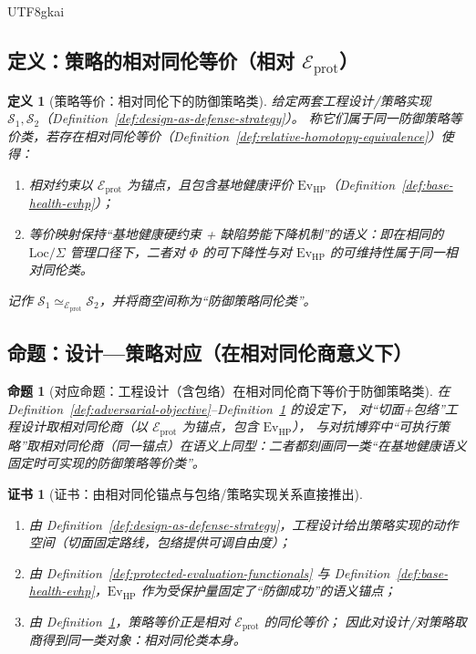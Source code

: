 \documentclass[12pt]{article}
\newtheorem{definition}{定义}[section]
\newtheorem{proposition}{命题}[section]
\newtheorem{certificate}{证书}[section]
\begin{document}
\begin{CJK*}{UTF8}{gkai}
\subsection{定义：策略的相对同伦等价（相对 $\mathcal{E}_{\mathrm{prot}}$）}

\begin{definition}[策略等价：相对同伦下的防御策略类]
\label{def:relative-strategy-equivalence}
给定两套工程设计/策略实现 $\mathcal{S}_1,\mathcal{S}_2$（Definition~\ref{def:design-as-defense-strategy}）。
称它们属于同一防御策略等价类，若存在相对同伦等价（Definition~\ref{def:relative-homotopy-equivalence}）使得：
\begin{enumerate}
  \item 相对约束以 $\mathcal{E}_{\mathrm{prot}}$ 为锚点，且包含基地健康评价 $\mathrm{Ev}_{\mathrm{HP}}$（Definition~\ref{def:base-health-evhp}）；
  \item 等价映射保持“基地健康硬约束 + 缺陷势能下降机制”的语义：即在相同的 $\mathrm{Loc}/\Sigma$ 管理口径下，二者对 $\Phi$ 的可下降性与对 $\mathrm{Ev}_{\mathrm{HP}}$
    的可维持性属于同一相对同伦类。
\end{enumerate}
记作 $\mathcal{S}_1\simeq_{\mathcal{E}_{\mathrm{prot}}}\mathcal{S}_2$，并将商空间称为“防御策略同伦类”。
\end{definition}

\subsection{命题：设计—策略对应（在相对同伦商意义下）}

\begin{proposition}[对应命题：工程设计（含包络）在相对同伦商下等价于防御策略类]
\label{prop:design-strategy-correspondence}
在 Definition~\ref{def:adversarial-objective}--Definition~\ref{def:relative-strategy-equivalence} 的设定下，
对“切面+包络”工程设计取相对同伦商（以 $\mathcal{E}_{\mathrm{prot}}$ 为锚点，包含 $\mathrm{Ev}_{\mathrm{HP}}$），
与对抗博弈中“可执行策略”取相对同伦商（同一锚点）在语义上同型：二者都刻画同一类“在基地健康语义固定时可实现的防御策略等价类”。
\end{proposition}

\begin{certificate}[证书：由相对同伦锚点与包络/策略实现关系直接推出]
\label{cert:design-strategy-correspondence}
\begin{enumerate}
  \item 由 Definition~\ref{def:design-as-defense-strategy}，工程设计给出策略实现的动作空间（切面固定路线，包络提供可调自由度）；
  \item 由 Definition~\ref{def:protected-evaluation-functionals} 与 Definition~\ref{def:base-health-evhp}，$\mathrm{Ev}
    _{\mathrm{HP}}$ 作为受保护量固定了“防御成功”的语义锚点；
  \item 由 Definition~\ref{def:relative-strategy-equivalence}，策略等价正是相对 $\mathcal{E}_{\mathrm{prot}}$ 的同伦等价；
    因此对设计/对策略取商得到同一类对象：相对同伦类本身。
\end{enumerate}
\end{certificate}


\end{CJK*}
\end{document}
